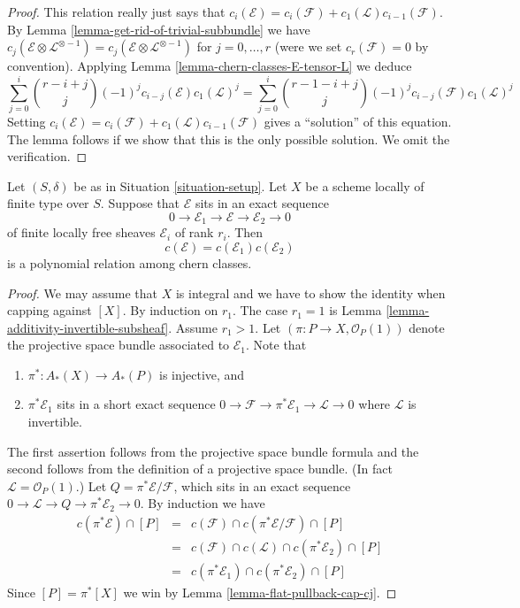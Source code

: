 \begin{proof}
This relation really just says that
$c_i(\mathcal{E}) = c_i(\mathcal{F}) + c_1(\mathcal{L})c_{i - 1}(\mathcal{F})$.
By Lemma \ref{lemma-get-rid-of-trivial-subbundle}
we have $c_j(\mathcal{E} \otimes \mathcal{L}^{\otimes -1})
= c_j(\mathcal{E} \otimes \mathcal{L}^{\otimes -1})$ for
$j = 0, \ldots, r$ (were we set $c_r(\mathcal{F}) = 0$ by
convention).
Applying Lemma \ref{lemma-chern-classes-E-tensor-L} we deduce
$$
\sum_{j = 0}^i
\binom{r - i + j}{j} (-1)^j c_{i - j}({\mathcal E}) c_1({\mathcal L})^j
=
\sum_{j = 0}^i
\binom{r - 1 - i + j}{j} (-1)^j c_{i - j}({\mathcal F}) c_1({\mathcal L})^j
$$
Setting
$c_i(\mathcal{E}) = c_i(\mathcal{F}) + c_1(\mathcal{L})c_{i - 1}(\mathcal{F})$
gives a ``solution'' of this equation. The lemma follows if we show
that this is the only possible solution. We omit the verification.
\end{proof}

\begin{lemma}
\label{lemma-additivity-chern-classes}
Let $(S, \delta)$ be as in Situation \ref{situation-setup}.
Let $X$ be a scheme locally of finite type over $S$.
Suppose that ${\mathcal E}$ sits in an
exact sequence
$$
0
\to
{\mathcal E}_1
\to
{\mathcal E}
\to
{\mathcal E}_2
\to
0
$$
of finite locally free sheaves $\mathcal{E}_i$ of rank $r_i$.
Then
$$
c({\mathcal E}) = c({\mathcal E}_1) c({\mathcal E}_2)
$$
is a polynomial relation among chern classes.
\end{lemma}

\begin{proof}
We may assume that $X$ is integral and we have to show the
identity when capping against $[X]$.
By induction on $r_1$. The case $r_1 = 1$ is
Lemma \ref{lemma-additivity-invertible-subsheaf}.
Assume $r_1 > 1$. Let $(\pi : P \to X, \mathcal{O}_P(1))$
denote the projective space bundle associated to $\mathcal{E}_1$. Note that
\begin{enumerate}
\item $\pi^* : A_*(X) \to A_*(P)$ is injective, and
\item $\pi^*\mathcal{E}_1$ sits in a short exact sequence
$0 \to \mathcal{F} \to \pi^*\mathcal{E}_1 \to \mathcal{L} \to 0$
where $\mathcal{L}$ is invertible.
\end{enumerate}
The first assertion follows from the projective space bundle formula
and the second follows from the definition of a projective space bundle.
(In fact $\mathcal{L} = \mathcal{O}_P(1)$.)
Let $Q = \pi^*\mathcal{E}/\mathcal{F}$, which sits in an
exact sequence $0 \to \mathcal{L} \to Q \to \pi^*\mathcal{E}_2 \to 0$.
By induction we have
\begin{eqnarray*}
c(\pi^*\mathcal{E}) \cap [P]
& = &
c(\mathcal{F}) \cap c(\pi^*\mathcal{E}/\mathcal{F}) \cap [P] \\
& = &
c(\mathcal{F}) \cap c(\mathcal{L}) \cap c(\pi^*\mathcal{E}_2) \cap [P] \\
& = &
c(\pi^*\mathcal{E}_1) \cap c(\pi^*\mathcal{E}_2) \cap [P]
\end{eqnarray*}
Since $[P] = \pi^*[X]$ we
win by Lemma \ref{lemma-flat-pullback-cap-cj}.
\end{proof}

